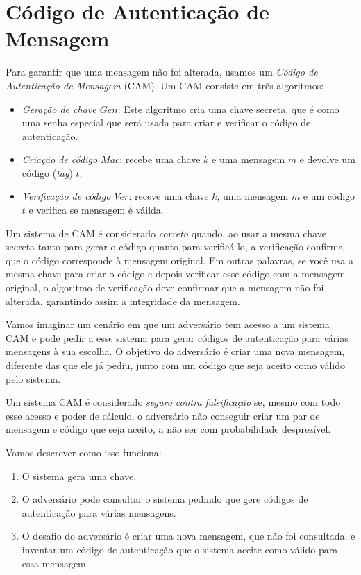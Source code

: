 \section{Código de Autenticação de Mensagem}
\label{sec:mac}

Para garantir que uma mensagem não foi alterada, usamos um {\em Código de Autenticação de Mensagem} (CAM).
Um CAM consiste em três algoritmos:

\begin{itemize}
\item[] {\em Geração de chave $Gen$}: Este algoritmo cria uma chave secreta, que é como uma senha especial que será usada para criar e verificar o código de autenticação.
\item[] {\em Criação de código $Mac$}: recebe uma chave $k$ e uma mensagem $m$ e devolve um código ({\em tag}) $t$.
\item[] {\em Verificação de código $Ver$}: receve uma chave $k$, uma mensagem $m$ e um código $t$ e verifica se mensagem é váilda.
\end{itemize}

Um sistema de CAM é considerado {\em correto} quando, ao usar a mesma chave secreta tanto para gerar o código quanto para verificá-lo, a verificação confirma que o código corresponde à mensagem original.
Em outras palavras, se você usa a mesma chave para criar o código e depois verificar esse código com a mensagem original, o algoritmo de verificação deve confirmar que a mensagem não foi alterada, garantindo assim a integridade da mensagem.

Vamos imaginar um cenário em que um adversário tem acesso a um sistema CAM e pode pedir a esse sistema para gerar códigos de autenticação para várias mensagens à sua escolha.
O objetivo do adversário é criar uma nova mensagem, diferente das que ele já pediu, junto com um código que seja aceito como válido pelo sistema.

Um sistema CAM é considerado {\em seguro contra falsificação} se, mesmo com todo esse acesso e poder de cálculo, o adversário não conseguir criar um par de mensagem e código que seja aceito, a não ser com probabilidade desprezível.

Vamos descrever como isso funciona:
\begin{enumerate}
\item O sistema gera uma chave.
\item O adversário pode consultar o sistema pedindo que gere códigos de autenticação para várias mensagens.
\item O desafio do adversário é criar uma nova mensagem, que não foi consultada, e inventar um código de autenticação que o sistema aceite como válido para essa mensagem.
\end{enumerate}

